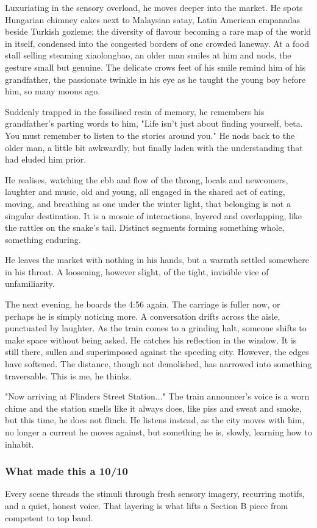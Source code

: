 \documentclass[a4paper]{article}
\begin{document}
Luxuriating in the sensory overload, he moves deeper into the market. He spots Hungarian chimney cakes next to Malaysian satay, Latin American empanadas beside Turkish gozleme; the diversity of flavour becoming a rare map of the world in itself, condensed into the congested borders of one crowded laneway. At a food stall selling steaming xiaolongbao, an older man smiles at him and nods, the gesture small but genuine. The delicate crows feet of his smile remind him of his grandfather, the passionate twinkle in his eye as he taught the young boy before him, so many moons ago.

Suddenly trapped in the fossilised resin of memory, he remembers his grandfather's parting words to him, "Life isn't just about finding yourself, beta. You must remember to listen to the stories around you." He nods back to the older man, a little bit awkwardly, but finally laden with the understanding that had eluded him prior.

He realises, watching the ebb and flow of the throng, locals and newcomers, laughter and music, old and young, all engaged in the shared act of eating, moving, and breathing as one under the winter light, that belonging is not a singular destination. It is a mosaic of interactions, layered and overlapping, like the rattles on the snake's tail. Distinct segments forming something whole, something enduring.

He leaves the market with nothing in his hands, but a warmth settled somewhere in his throat. A loosening, however slight, of the tight, invisible vice of unfamiliarity.

The next evening, he boards the 4:56 again. The carriage is fuller now, or perhaps he is simply noticing more. A conversation drifts across the aisle, punctuated by laughter. As the train comes to a grinding halt, someone shifts to make space without being asked. He catches his reflection in the window. It is still there, sullen and superimposed against the speeding city. However, the edges have softened. The distance, though not demolished, has narrowed into something traversable. This is me, he thinks.

"Now arriving at Flinders Street Station..." The train announcer's voice is a worn chime and the station smells like it always does, like piss and sweat and smoke, but this time, he does not flinch. He listens instead, as the city moves with him, no longer a current he moves against, but something he is, slowly, learning how to inhabit.

\subsubsection{What made this a 10/10}
Every scene threads the stimuli through fresh sensory imagery, recurring motifs, and a quiet, honest voice. That layering is what lifts a Section B piece from competent to top band.
\end{document}
